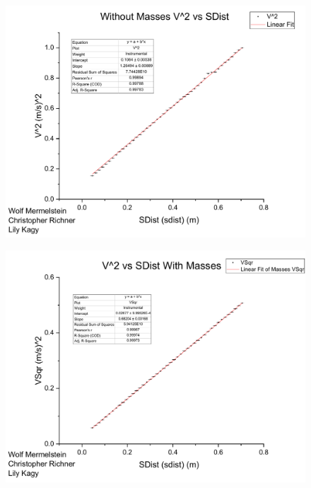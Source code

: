 \documentclass[coverpage]{article}
\begin{document}
	\begin{figure}[h]
		\centering
		\includegraphics[width=6in]{plots/withMassesPlot.pdf}
	\end{figure}
		
	\begin{figure}[h] 
		\centering
		\includegraphics[width=6in]{plots/withoutMassesPlot.pdf}
	\end{figure}
	
\end{document}

